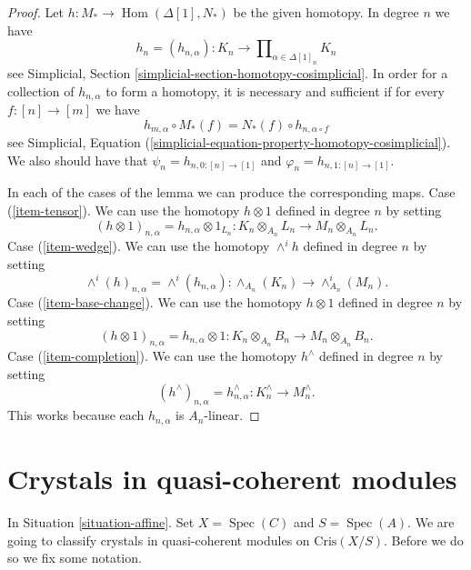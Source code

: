 \documentclass{stacks-project}
\theoremstyle{plain}
\theoremstyle{definition}
\theoremstyle{remark}
\numberwithin{equation}{subsection}
\def\Spec{\mathop{\mathrm{Spec}}}
\def\Hom{\mathop{\mathrm{Hom}}\nolimits}
\begin{document}
\begin{proof}
Let $h : M_* \longrightarrow \Hom(\Delta[1], N_*)$ be the given
homotopy. In degree $n$ we have
$$
h_n = (h_{n, \alpha}) :
K_n \longrightarrow
\prod\nolimits_{\alpha \in \Delta[1]_n} K_n
$$
see Simplicial, Section \ref{simplicial-section-homotopy-cosimplicial}.
In order for a collection of $h_{n, \alpha}$ to form a homotopy,
it is necessary and sufficient if for every $f : [n] \to [m]$ we
have
$$
h_{m, \alpha} \circ M_*(f) = N_*(f) \circ h_{n, \alpha \circ f}
$$
see
Simplicial, Equation (\ref{simplicial-equation-property-homotopy-cosimplicial}).
We also should have that $\psi_n = h_{n, 0 : [n] \to [1]}$ and
$\varphi_n = h_{n, 1 : [n] \to [1]}$.

\medskip\noindent
In each of the cases of the lemma we can produce the corresponding maps.
Case (\ref{item-tensor}). We can use the homotopy $h \otimes 1$ defined
in degree $n$ by setting
$$
(h \otimes 1)_{n, \alpha} = h_{n, \alpha} \otimes 1_{L_n} :
K_n \otimes_{A_n} L_n
\longrightarrow
M_n \otimes_{A_n} L_n.
$$
Case (\ref{item-wedge}). We can use the homotopy $\wedge^ih$ defined
in degree $n$ by setting
$$
\wedge^i(h)_{n, \alpha} = \wedge^i(h_{n, \alpha}) :
\wedge_{A_n}(K_n)
\longrightarrow
\wedge^i_{A_n}(M_n).
$$
Case (\ref{item-base-change}). We can use the homotopy $h \otimes 1$ defined
in degree $n$ by setting
$$
(h \otimes 1)_{n, \alpha} = h_{n, \alpha} \otimes 1 :
K_n \otimes_{A_n} B_n
\longrightarrow
M_n \otimes_{A_n} B_n.
$$
Case (\ref{item-completion}). We can use the homotopy $h^\wedge$ defined
in degree $n$ by setting
$$
(h^\wedge)_{n, \alpha} = h_{n, \alpha}^\wedge :
K_n^\wedge
\longrightarrow
M_n^\wedge.
$$
This works because each $h_{n, \alpha}$ is $A_n$-linear.
\end{proof}






\section{Crystals in quasi-coherent modules}
\label{section-quasi-coherent-crystals}

\noindent
In Situation \ref{situation-affine}.
Set $X = \Spec(C)$ and $S = \Spec(A)$. We are going to
classify crystals in quasi-coherent modules on $\text{Cris}(X/S)$.
Before we do so we fix some notation.
\end{document}
